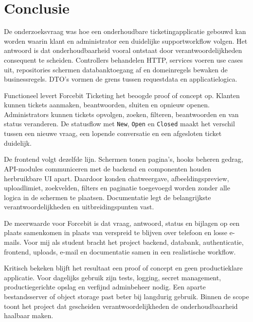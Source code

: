 
\chapter{Conclusie}%
\label{ch:conclusie}


De onderzoeksvraag was hoe een onderhoudbare ticketingapplicatie gebouwd kan worden waarin klant en administrator een duidelijke supportworkflow volgen. Het antwoord is dat onderhoudbaarheid vooral ontstaat door verantwoordelijkheden consequent te scheiden. Controllers behandelen HTTP, services voeren use cases uit, repositories schermen databanktoegang af en domeinregels bewaken de businessregels. DTO's vormen de grens tussen requestdata en applicatielogica.

Functioneel levert Forcebit Ticketing het beoogde proof of concept op. Klanten kunnen tickets aanmaken, beantwoorden, sluiten en opnieuw openen. Administrators kunnen tickets opvolgen, zoeken, filteren, beantwoorden en van status veranderen. De statusflow met \texttt{New}, \texttt{Open} en \texttt{Closed} maakt het verschil tussen een nieuwe vraag, een lopende conversatie en een afgesloten ticket duidelijk.

De frontend volgt dezelfde lijn. Schermen tonen pagina's, hooks beheren gedrag, API-modules communiceren met de backend en componenten houden herbruikbare UI apart. Daardoor konden chatweergave, afbeeldingspreview, uploadlimiet, zoekvelden, filters en paginatie toegevoegd worden zonder alle logica in de schermen te plaatsen. Documentatie legt de belangrijkste verantwoordelijkheden en uitbreidingspunten vast.

De meerwaarde voor Forcebit is dat vraag, antwoord, status en bijlagen op een plaats samenkomen in plaats van verspreid te blijven over telefoon en losse e-mails. Voor mij als student bracht het project backend, databank, authenticatie, frontend, uploads, e-mail en documentatie samen in een realistische workflow.

Kritisch bekeken blijft het resultaat een proof of concept en geen productieklare applicatie. Voor dagelijks gebruik zijn tests, logging, secret management, productiegerichte opslag en verfijnd adminbeheer nodig. Een aparte bestandsserver of object storage past beter bij langdurig gebruik. Binnen de scope toont het project dat gescheiden verantwoordelijkheden de onderhoudbaarheid haalbaar maken.
